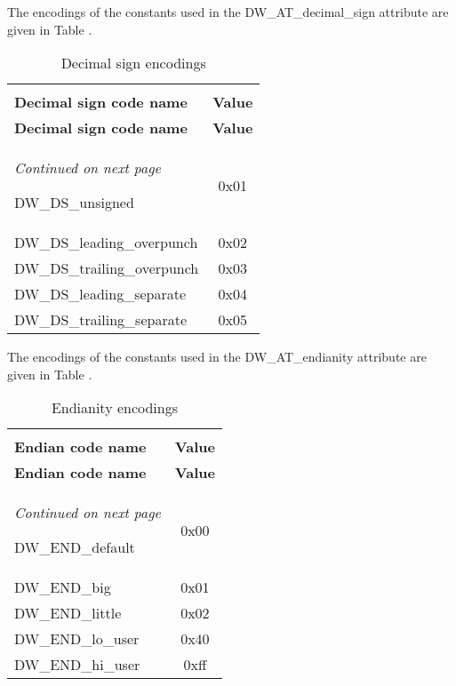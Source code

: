 The encodings of the constants used in the 
DW\_AT\_decimal\_sign attribute 
are given in 
Table .


\begin{centering}
\setlength{\extrarowheight}{0.1cm}
\begin{longtable}{l|c}
  \caption{Decimal sign encodings} \label{tab:decimalsignencodings} \\
  \hline \\ \bfseries Decimal sign code name&\bfseries Value \\ \hline
\endfirsthead
  \bfseries Decimal sign code name&\bfseries Value\\ \hline
\endhead
  \hline \emph{Continued on next page}
\endfoot
  \hline
\endlastfoot

DW\_DS\_unsigned & 0x01  \\
DW\_DS\_leading\_overpunch & 0x02  \\
DW\_DS\_trailing\_overpunch & 0x03  \\
DW\_DS\_leading\_separate & 0x04  \\
DW\_DS\_trailing\_separate & 0x05  \\

\end{longtable}
\end{centering}

The encodings of the constants used in the 
DW\_AT\_endianity attribute are given in 
Table .

\begin{centering}
\setlength{\extrarowheight}{0.1cm}
\begin{longtable}{l|c}
  \caption{Endianity encodings} \label{tab:endianityencodings}\\
  \hline \\ \bfseries Endian code name&\bfseries Value \\ \hline
\endfirsthead
  \bfseries Endian code name&\bfseries Value\\ \hline
\endhead
  \hline \emph{Continued on next page}
\endfoot
  \hline
\endlastfoot

DW\_END\_default  & 0x00 \\
DW\_END\_big & 0x01 \\
DW\_END\_little & 0x02 \\
DW\_END\_lo\_user & 0x40 \\
DW\_END\_hi\_user & 0xff \\

\end{longtable}
\end{centering}

